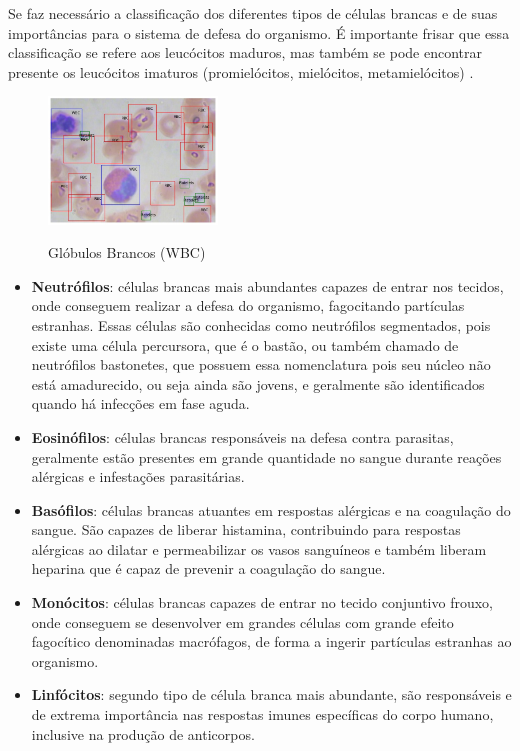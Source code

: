Se faz necessário a classificação dos diferentes tipos de células brancas e de suas importâncias para o sistema de defesa do organismo. É importante frisar que essa classificação se refere aos leucócitos maduros, mas também se pode encontrar presente os leucócitos imaturos (promielócitos, mielócitos, metamielócitos) \cite{manualHematologia}.

\begin{figure}[!htb]
    \centering
    \caption{Glóbulos Brancos (WBC)}
    \includegraphics[width=0.40\textwidth]{img/wbc.jpg}
    \label{fig:wbc}
 \end{figure}
 
\begin{itemize}
    \item \textbf{Neutrófilos}: células brancas mais abundantes capazes de entrar nos tecidos, onde conseguem realizar a defesa do organismo, fagocitando partículas estranhas. Essas células são conhecidas como neutrófilos segmentados, pois existe uma célula percursora, que é o bastão, ou também chamado de neutrófilos bastonetes, que possuem essa nomenclatura pois seu núcleo não está amadurecido, ou seja ainda são jovens, e geralmente são identificados quando há infecções em fase aguda. 
    \item \textbf{Eosinófilos}: células brancas responsáveis na defesa contra parasitas, geralmente estão presentes em grande quantidade no sangue durante reações alérgicas e infestações parasitárias.
    \item \textbf{Basófilos}: células brancas atuantes em respostas alérgicas e na coagulação do sangue. São capazes de liberar histamina, contribuindo para respostas alérgicas ao dilatar e permeabilizar os vasos sanguíneos e também liberam heparina que é capaz de prevenir a coagulação do sangue.
    \item \textbf{Monócitos}: células brancas capazes de entrar no tecido conjuntivo frouxo, onde conseguem se desenvolver em grandes células com grande efeito fagocítico denominadas macrófagos, de forma a ingerir partículas estranhas ao organismo.
    \item \textbf{Linfócitos}: segundo tipo de célula branca mais abundante, são responsáveis e de extrema importância nas respostas imunes específicas do corpo humano, inclusive na produção de anticorpos.
\end{itemize}

